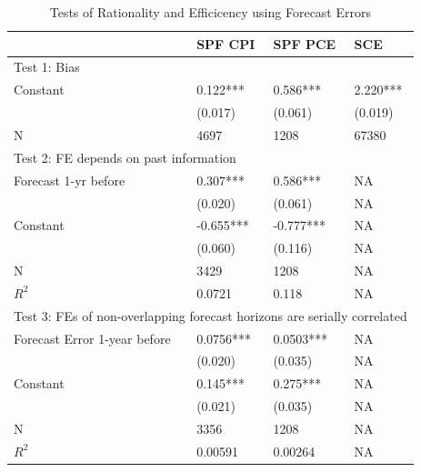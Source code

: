 \documentclass[]{article}
\begin{document}
\begin{table}[ht]
	\caption{Tests of Rationality and Efficicency using Forecast Errors}
	\label{NullTestTable}
	\centering 
\begin{tabular}{llll}
	\hline 
	& SPF CPI          & SPF PCE          & SCE            \\
	\hline 
	\multicolumn{4}{l}{Test 1: Bias}                                                           \\
	\hline 
	Constant                            & 0.122***         & 0.586***         & 2.220***       \\
	& (0.017)          & (0.061)          & (0.019)        \\
	\hline 
	N                                   & 4697             & 1208             & 67380          \\
	\hline 
	\multicolumn{4}{l}{Test 2: FE depends on past information}                                  \\
	\hline 
	Forecast 1-yr before                & 0.307***         & 0.586***         & NA             \\
	& (0.020)          & (0.061)          & NA             \\
	Constant                            & -0.655***        & -0.777***        & NA             \\
	& (0.060)          & (0.116)          & NA             \\
	\hline 
	N                                   & 3429             & 1208             & NA             \\
	$R^2$                 & 0.0721           & 0.118            & NA             \\
	\hline 
	\multicolumn{4}{l}{Test 3: FEs of non-overlapping forecast horizons are serially correlated} \\
	\hline 
	Forecast Error 1-year before        & 0.0756***        & 0.0503***        & NA             \\
	& (0.020)          & (0.035)          & NA             \\
	Constant                            & 0.145***         & 0.275***         & NA             \\
	& (0.021)          & (0.035)          & NA             \\
	\hline 
	N                                   & 3356             & 1208             & NA             \\
	$R^2$                   & 0.00591          & 0.00264          & NA             \\

\end{tabular}
\end{table}
\end{document}
